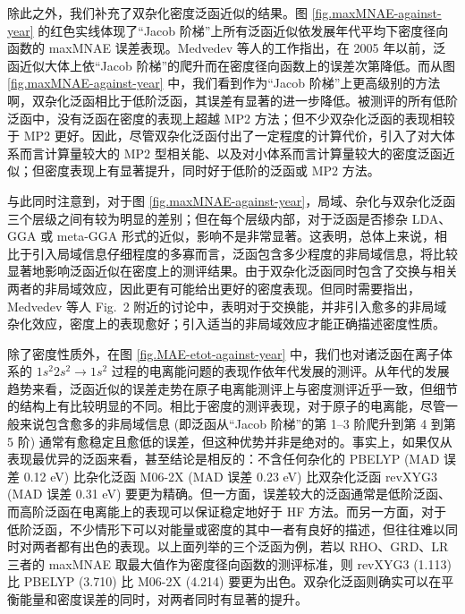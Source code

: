 除此之外，我们补充了双杂化密度泛函近似的结果。图 \ref{fig.maxMNAE-against-year} 的红色实线体现了“Jacob 阶梯”上所有泛函近似依发展年代平均下密度径向函数的 maxMNAE 误差表现。Medvedev 等人的工作指出，在 2005 年以前，泛函近似大体上依“Jacob 阶梯”的爬升而在密度径向函数上的误差次第降低。而从图 \ref{fig.maxMNAE-against-year} 中，我们看到作为“Jacob 阶梯”上更高级别的方法啊，双杂化泛函相比于低阶泛函，其误差有显著的进一步降低。被测评的所有低阶泛函中，没有泛函在密度的表现上超越 MP2 方法；但不少双杂化泛函的表现相较于 MP2 更好。因此，尽管双杂化泛函付出了一定程度的计算代价，引入了对大体系而言计算量较大的 MP2 型相关能、以及对小体系而言计算量较大的密度泛函近似；但密度表现上有显著提升，同时好于低阶的泛函或 MP2 方法。

与此同时注意到，对于图 \ref{fig.maxMNAE-against-year}，局域、杂化与双杂化泛函三个层级之间有较为明显的差别；但在每个层级内部，对于泛函是否掺杂 LDA、GGA 或 meta-GGA 形式的近似，影响不是非常显著。这表明，总体上来说，相比于引入局域信息仔细程度的多寡而言，泛函包含多少程度的非局域信息，将比较显著地影响泛函近似在密度上的测评结果。由于双杂化泛函同时包含了交换与相关两者的非局域效应，因此更有可能给出更好的密度表现。但同时需要指出，Medvedev 等人 Fig.\ 2 附近的讨论中，表明对于交换能，并非引入愈多的非局域杂化效应，密度上的表现愈好；引入适当的非局域效应才能正确描述密度性质。

除了密度性质外，在图 \ref{fig.MAE-etot-against-year} 中，我们也对诸泛函在离子体系的 $1s^2 2s^2 \rightarrow 1s^2$ 过程的电离能问题的表现作依年代发展的测评。从年代的发展趋势来看，泛函近似的误差走势在原子电离能测评上与密度测评近乎一致，但细节的结构上有比较明显的不同。相比于密度的测评表现，对于原子的电离能，尽管一般来说包含愈多的非局域信息 (即泛函从“Jacob 阶梯”的第 1--3 阶爬升到第 4 到第 5 阶) 通常有愈稳定且愈低的误差，但这种优势并非是绝对的。事实上，如果仅从表现最优异的泛函来看，甚至结论是相反的：不含任何杂化的 PBELYP (MAD 误差 0.12 eV) 比杂化泛函 M06-2X (MAD 误差 0.23 eV) 比双杂化泛函 revXYG3 (MAD 误差 0.31 eV) 要更为精确。但一方面，误差较大的泛函通常是低阶泛函、而高阶泛函在电离能上的表现可以保证稳定地好于 HF 方法。而另一方面，对于低阶泛函，不少情形下可以对能量或密度的其中一者有良好的描述，但往往难以同时对两者都有出色的表现。以上面列举的三个泛函为例，若以 RHO、GRD、LR 三者的 maxMNAE 取最大值作为密度径向函数的测评标准，则 revXYG3 (1.113) 比 PBELYP (3.710) 比 M06-2X (4.214) 要更为出色。双杂化泛函则确实可以在平衡能量和密度误差的同时，对两者同时有显著的提升。

